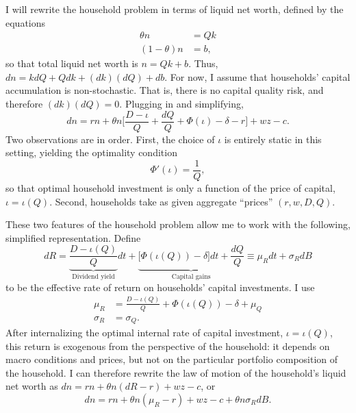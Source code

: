 \documentclass[11pt]{extarticle}
\theoremstyle{plain}
\theoremstyle{definition}
\begin{document}
I will rewrite the household problem in terms of liquid net worth, defined by the equations 
\begin{align*}
	\theta n &= Q k \\
	(1-\theta) n &= b,
\end{align*}
so that total liquid net worth is $n = Qk + b$. Thus, $dn = k dQ + Q dk + (dk)(dQ) + db$. For now, I assume that households' capital accumulation is non-stochastic. That is, there is no capital quality risk, and therefore $(dk)(dQ) = 0$. Plugging in and simplifying, 
\begin{equation*}
	dn = rn +  \theta n \bigg[ \frac{D - \iota }{Q} +  \frac{dQ}{Q} + \Phi(\iota) - \delta - r \bigg]  + w z - c .
\end{equation*}
Two observations are in order. First, the choice of $\iota$ is entirely static in this setting, yielding the optimality condition
\begin{equation*}
	\Phi'(\iota) = \frac{1}{Q},
\end{equation*}
so that optimal household investment is only a function of the price of capital, $\iota = \iota(Q)$. Second, households take as given aggregate ``prices'' $(r, w, D, Q)$. 


These two features of the household problem allow me to work with the following, simplified representation. Define 
\begin{equation*}
	dR = \underbrace{\frac{D - \iota (Q) }{Q}}_\text{Dividend yield} dt + \underbrace{\Big[\Phi(\iota(Q)) - \delta \Big] dt +  \frac{dQ}{Q}}_\text{Capital gains} \equiv \mu_R dt + \sigma_R dB
\end{equation*}
to be the effective rate of return on households' capital investments. I use 
\begin{align*}
	\mu_R &= \frac{D - \iota (Q) }{Q}  + \Phi(\iota(Q)) - \delta + \mu_Q \\
	\sigma_R &= \sigma_Q. 
\end{align*}
After internalizing the optimal internal rate of capital investment, $\iota = \iota(Q)$, this return is exogenous from the perspective of the household: it depends on macro conditions and prices, but not on the particular portfolio composition of the household. I can therefore rewrite the law of motion of the household's liquid net worth as $dn = rn + \theta n (dR - r) + wz - c$, or 
\begin{equation*}
	dn = rn + \theta n (\mu_R - r) + wz - c + \theta n \sigma_R dB. 
\end{equation*}
\end{document}
